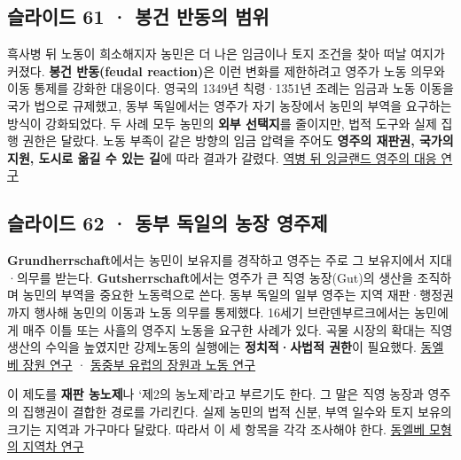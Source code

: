\documentclass[10pt,a4paper]{article}
\begin{document}
\subsection{슬라이드 61 · 봉건 반동의 범위}
흑사병 뒤 노동이 희소해지자 농민은 더 나은 임금이나 토지 조건을 찾아 떠날 여지가 커졌다. \textbf{봉건 반동(feudal reaction)}은 이런 변화를 제한하려고 영주가 노동 의무와 이동 통제를 강화한 대응이다. 영국의 1349년 칙령·1351년 조례는 임금과 노동 이동을 국가 법으로 규제했고, 동부 독일에서는 영주가 자기 농장에서 농민의 부역을 요구하는 방식이 강화되었다. 두 사례 모두 농민의 \textbf{외부 선택지}를 줄이지만, 법적 도구와 실제 집행 권한은 달랐다. 노동 부족이 같은 방향의 임금 압력을 주어도 \textbf{영주의 재판권, 국가의 지원, 도시로 옮길 수 있는 길}에 따라 결과가 갈렸다. \href{https://www.cambridge.org/core/journals/continuity-and-change/article/servile-migration-and-seigniorial-reaction-in-england-the-serfs-of-great-waltham-and-high-easter-essex-c-13361361/FEE7266397005ACF06410A59D9CB33AD}{역병 뒤 잉글랜드 영주의 대응 연구}\par

\subsection{슬라이드 62 · 동부 독일의 농장 영주제}
\textbf{Grundherrschaft}에서는 농민이 보유지를 경작하고 영주는 주로 그 보유지에서 지대·의무를 받는다. \textbf{Gutsherrschaft}에서는 영주가 큰 직영 농장(Gut)의 생산을 조직하며 농민의 부역을 중요한 노동력으로 쓴다. 동부 독일의 일부 영주는 지역 재판·행정권까지 행사해 농민의 이동과 노동 의무를 통제했다. 16세기 브란덴부르크에서는 농민에게 매주 이틀 또는 사흘의 영주지 노동을 요구한 사례가 있다. 곡물 시장의 확대는 직영 생산의 수익을 높였지만 강제노동의 실행에는 \textbf{정치적·사법적 권한}이 필요했다. \href{https://assets.cambridge.org/97805218/15581/sample/9780521815581ws.pdf}{동엘베 장원 연구} · \href{https://www.cambridge.org/core/books/abs/cambridge-world-history-of-slavery/manorialism-and-rural-subjection-in-east-central-europe-15001800/6FC814B3478C790753E5D84BB2753186}{동중부 유럽의 장원과 노동 연구}\par

이 제도를 \textbf{재판 농노제}나 ‘제2의 농노제’라고 부르기도 한다. 그 말은 직영 농장과 영주의 집행권이 결합한 경로를 가리킨다. 실제 농민의 법적 신분, 부역 일수와 토지 보유의 크기는 지역과 가구마다 달랐다. 따라서 이 세 항목을 각각 조사해야 한다. \href{https://www.cambridge.org/core/journals/central-european-history/article/abs/gutsherrschaft-in-east-elbian-germany-and-livonia-15001800-a-critique-of-the-model/E75E65E9C9B7B67DE3D56CCAC7CCDCE1}{동엘베 모형의 지역차 연구}\par
\end{document}
